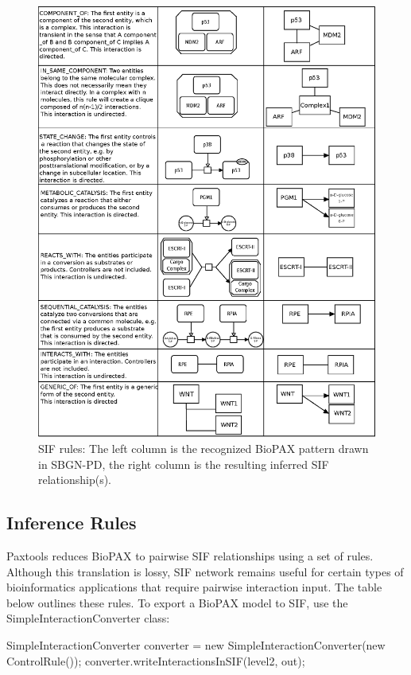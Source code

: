 \documentclass{tufte-book}
\begin{document}
\begin{figure}[h]
\includegraphics[width=\linewidth]{sifplain3.eps}%
\caption{SIF rules: The left column is the recognized BioPAX pattern drawn in SBGN-PD, the right column is the resulting inferred SIF relationship(s).}
\label{fig:SIF}%
\end{figure}

\subsection{Inference Rules}
Paxtools reduces BioPAX  to pairwise SIF relationships using a set of rules. Although this translation is lossy, SIF network remains useful for certain types of bioinformatics applications that require pairwise interaction input. The table below outlines these rules.
To export a BioPAX model to SIF, use the SimpleInteractionConverter class: 

\begin{javacode}
   SimpleInteractionConverter converter = 
   new SimpleInteractionConverter(new ControlRule());
   converter.writeInteractionsInSIF(level2, out);
\end{javacode}
\end{document}
